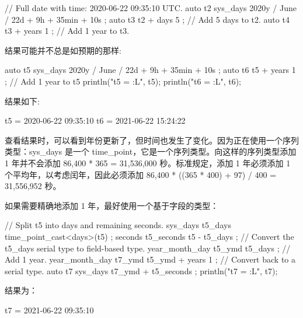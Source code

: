 \begin{cpp}
// Full date with time: 2020-06-22 09:35:10 UTC.
auto t2 { sys_days { 2020y / June / 22d } + 9h + 35min + 10s };
auto t3 { t2 + days { 5 } }; // Add 5 days to t2.
auto t4 { t3 + years { 1 } }; // Add 1 year to t3.
\end{cpp}

结果可能并不总是如预期的那样:

\begin{cpp}
auto t5 { sys_days { 2020y / June / 22d } + 9h + 35min + 10s };
auto t6 { t5 + years { 1 } }; // Add 1 year to t5
println("t5 = {:L}", t5);
println("t6 = {:L}", t6);
\end{cpp}

结果如下:

\begin{shell}
t5 = 2020-06-22 09:35:10
t6 = 2021-06-22 15:24:22
\end{shell}

查看结果时，可以看到年份更新了，但时间也发生了变化。因为正在使用一个序列类型：sys\_days 是一个 time\_point，它是一个序列类型。向这样的序列类型添加 1 年并不会添加 86,400 * 365 = 31,536,000 秒。标准规定，添加 1 年必须添加 1 个平均年，以考虑闰年，因此必须添加 86,400 * ((365 * 400) + 97) / 400 = 31,556,952 秒。

如果需要精确地添加 1 年，最好使用一个基于字段的类型：

\begin{cpp}
// Split t5 into days and remaining seconds.
sys_days t5_days { time_point_cast<days>(t5) };
seconds t5_seconds { t5 - t5_days };
// Convert the t5_days serial type to field-based type.
year_month_day t5_ymd { t5_days };
// Add 1 year.
year_month_day t7_ymd { t5_ymd + years { 1 } };
// Convert back to a serial type.
auto t7 { sys_days { t7_ymd } + t5_seconds };
println("t7 = {:L}", t7);
\end{cpp}

结果为：

\begin{shell}
t7 = 2021-06-22 09:35:10
\end{shell}




